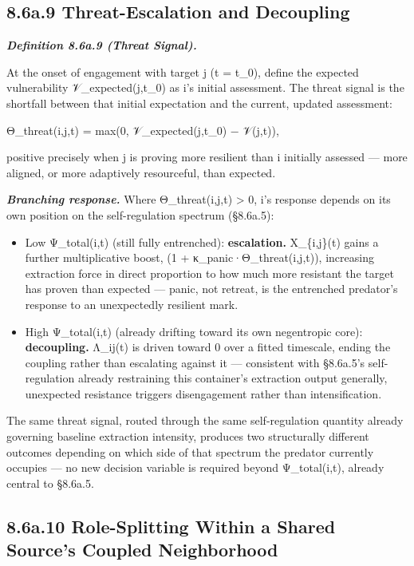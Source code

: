\documentclass[
]{article}
\begin{document}
\hypertarget{a.9-threat-escalation-and-decoupling}{%
\subsection{8.6a.9 Threat-Escalation and
Decoupling}\label{a.9-threat-escalation-and-decoupling}}

\emph{\textbf{Definition 8.6a.9 (Threat Signal).}}

At the onset of engagement with target j (t = t\_0), define the expected
vulnerability 𝒱\_expected(j,t\_0) as i's initial assessment. The threat
signal is the shortfall between that initial expectation and the
current, updated assessment:

Θ\_threat(i,j,t) = max(0, 𝒱\_expected(j,t\_0) − 𝒱(j,t)),

positive precisely when j is proving more resilient than i initially
assessed --- more aligned, or more adaptively resourceful, than
expected.

\emph{\textbf{Branching response.}} Where Θ\_threat(i,j,t)
\textgreater{} 0, i's response depends on its own position on the
self-regulation spectrum (§8.6a.5):

\begin{itemize}
\item
  Low Ψ\_total(i,t) (still fully entrenched): \textbf{escalation.}
  X\_\{i,j\}(t) gains a further multiplicative boost, (1 +
  κ\_panic·Θ\_threat(i,j,t)), increasing extraction force in direct
  proportion to how much more resistant the target has proven than
  expected --- panic, not retreat, is the entrenched predator's response
  to an unexpectedly resilient mark.
\item
  High Ψ\_total(i,t) (already drifting toward its own negentropic core):
  \textbf{decoupling.} Λ\_ij(t) is driven toward 0 over a fitted
  timescale, ending the coupling rather than escalating against it ---
  consistent with §8.6a.5's self-regulation already restraining this
  container's extraction output generally, unexpected resistance
  triggers disengagement rather than intensification.
\end{itemize}

The same threat signal, routed through the same self-regulation quantity
already governing baseline extraction intensity, produces two
structurally different outcomes depending on which side of that spectrum
the predator currently occupies --- no new decision variable is required
beyond Ψ\_total(i,t), already central to §8.6a.5.

\hypertarget{a.10-role-splitting-within-a-shared-sources-coupled-neighborhood}{%
\subsection{8.6a.10 Role-Splitting Within a Shared Source's Coupled
Neighborhood}\label{a.10-role-splitting-within-a-shared-sources-coupled-neighborhood}}
\end{document}
